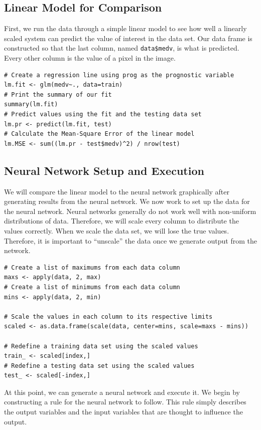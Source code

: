 \subsection{Linear Model for Comparison}

First, we run the data through a simple linear model to see how well a linearly scaled system can predict the value of interest in the data set.
Our data frame is constructed so that the last column, named \texttt{data\$medv}, is what is predicted.
Every other column is the value of a pixel in the image.

\begin{lstlisting}
# Create a regression line using prog as the prognostic variable
lm.fit <- glm(medv~., data=train)
# Print the summary of our fit
summary(lm.fit)
# Predict values using the fit and the testing data set
lm.pr <- predict(lm.fit, test)
# Calculate the Mean-Square Error of the linear model
lm.MSE <- sum((lm.pr - test$medv)^2) / nrow(test)
\end{lstlisting}

\subsection{Neural Network Setup and Execution}

We will compare the linear model to the neural network graphically after generating results from the neural network.
We now work to set up the data for the neural network.
Neural networks generally do not work well with non-uniform distributions of data.
Therefore, we will scale every column to distribute the values correctly.
When we scale the data set, we will lose the true values.
Therefore, it is important to ``unscale'' the data once we generate output from the network.

\begin{lstlisting}
# Create a list of maximums from each data column
maxs <- apply(data, 2, max)
# Create a list of minimums from each data column
mins <- apply(data, 2, min)

# Scale the values in each column to its respective limits
scaled <- as.data.frame(scale(data, center=mins, scale=maxs - mins))

# Redefine a training data set using the scaled values
train_ <- scaled[index,]
# Redefine a testing data set using the scaled values
test_ <- scaled[-index,]
\end{lstlisting}

At this point, we can generate a neural network and execute it.
We begin by constructing a rule for the neural network to follow.
This rule simply describes the output variables and the input variables that are thought to influence the output. 


